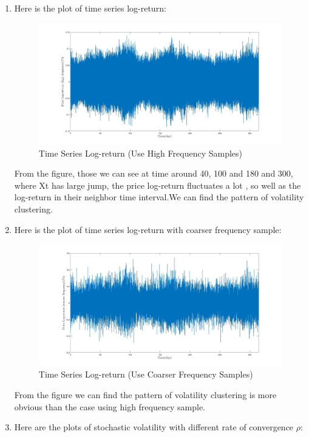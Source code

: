 \documentclass[12pt,letterpaper]{article}
\begin{document}
\begin{enumerate}[label=\textbf{(\Alph*)}]
        
\item Here is the plot of time series log-return:
        \begin{figure}[H]
            \centering
            \includegraphics[width=15cm]{figures/p1_ex4_d.jpg}
            \caption{Time Series Log-return (Use High Frequency Samples)}
            \label{fig:4d}
       \end{figure} 
From the figure, those we can see at time around 40, 100 and 180 and 300, where Xt has large jump, the price log-return fluctuates a lot , so well as the log-return in their neighbor time interval.We can find the pattern of volatility clustering.       
\item Here is the plot of time series log-return with coarser frequency sample:
        \begin{figure}[H]
            \centering
            \includegraphics[width=15cm]{figures/p1_ex4_e.jpg}
            \caption{Time Series Log-return (Use Coarser Frequency Samples)}
            \label{fig:4e}
        \end{figure}    
From the figure we can find the pattern of volatility clustering is more obvious than the case using high frequency sample.
\item Here are the plots of stochastic volatility with different rate of convergence $\rho$:

\end{enumerate}
\end{document}
